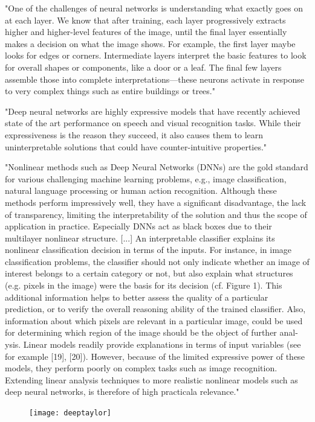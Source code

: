 "One of the challenges of neural networks is understanding what exactly goes on at each layer.
We know that after training, each layer progressively extracts higher and higher-level features of the image, until the final layer essentially makes a decision on what the image shows.
For example, the first layer maybe looks for edges or corners.
Intermediate layers interpret the basic features to look for overall shapes or components, like a door or a leaf.
The final few layers assemble those into complete interpretations---these neurons activate in response to very complex things such as entire buildings or trees." \cite{Mordvintsev2015}

"Deep neural networks are highly expressive models that have recently achieved state of the art performance on speech and visual recognition tasks. While their expressiveness is the reason they succeed, it also causes them to learn uninterpretable solutions that could have counter-intuitive properties." \cite{Szegedy2013}

"Nonlinear methods such as Deep Neural Networks (DNNs) are the gold standard for various challenging machine learning problems, e.g., image classification, natural language processing or human action recognition. Although these methods perform impressively well, they have a significant disadvantage, the lack of transparency, limiting the interpretability of the solution and thus the scope of application in practice. Especially DNNs act as black boxes due to their multilayer nonlinear structure.
[...]
An interpretable classifier explains its nonlinear classification decision in terms of the inputs. For instance, in image classification problems, the classifier should not only indicate whether an image of interest belongs to a certain category or not, but also explain what structures (e.g. pixels in the image) were the basis for its decision (cf. Figure 1). This additional information helps to better assess the quality of a particular prediction, or to verify the overall reasoning ability of the trained classifier. Also, information about which pixels are relevant in a particular image, could be used for determining which region of the image should be the object of further anal- ysis. Linear models readily provide explanations in terms of input variables (see for example [19], [20]). However, because of the limited expressive power of these models, they perform poorly on complex tasks such as image recognition. Extending linear analysis techniques to more realistic nonlinear models such as deep neural networks, is therefore of high practicala relevance." \cite{Montavon2017}
\begin{figure}
	\centering
	\texttt{[image: deeptaylor]}\\
\end{figure}

